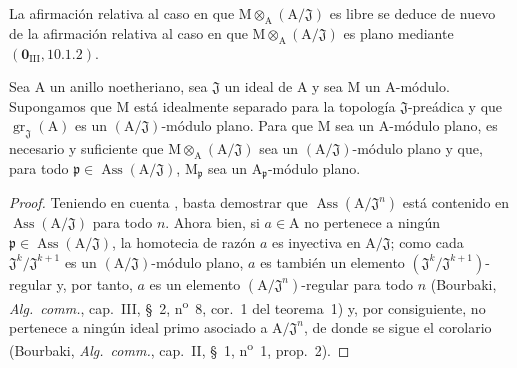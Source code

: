 La afirmación relativa al caso en que $\mathrm{M}\otimes_\mathrm{A}(\mathrm{A}/\mathfrak{J})$ es libre se deduce de nuevo de la afirmación relativa al caso en que $\mathrm{M}\otimes_\mathrm{A}(\mathrm{A}/\mathfrak{J})$ es plano mediante $(\mathbf{0}_{\mathrm{III}},10.1.2)$.

\begin{corollary}[11.4.10]
\label{IV.11.4.10}
Sea $\mathrm{A}$ un anillo noetheriano, sea $\mathfrak{J}$ un ideal de $\mathrm{A}$ y sea $\mathrm{M}$ un $\mathrm{A}$-módulo.
Supongamos que $\mathrm{M}$ está idealmente separado para la topología $\mathfrak{J}$-preádica y que $\operatorname{gr}_\mathfrak{J}(\mathrm{A})$ es un
$(\mathrm{A}/\mathfrak{J})$-módulo plano. Para que $\mathrm{M}$ sea un $\mathrm{A}$-módulo plano, es necesario y suficiente que $\mathrm{M}\otimes_\mathrm{A}(\mathrm{A}/\mathfrak{J})$ sea
un $(\mathrm{A}/\mathfrak{J})$-módulo plano y que, para todo $\mathfrak{p}\in\operatorname{Ass}(\mathrm{A}/\mathfrak{J})$, $\mathrm{M}_\mathfrak{p}$ sea un $\mathrm{A}_\mathfrak{p}$-módulo plano.
\end{corollary}

\begin{proof}
Teniendo en cuenta , basta demostrar que $\operatorname{Ass}(\mathrm{A}/\mathfrak{J}^n)$ está contenido en
$\operatorname{Ass}(\mathrm{A}/\mathfrak{J})$ para todo $n$. Ahora bien, si $a\in\mathrm{A}$ no pertenece a ningún $\mathfrak{p}\in\operatorname{Ass}(\mathrm{A}/\mathfrak{J})$, la homotecia
de razón $a$ es inyectiva en $\mathrm{A}/\mathfrak{J}$; como cada $\mathfrak{J}^k/\mathfrak{J}^{k+1}$ es un $(\mathrm{A}/\mathfrak{J})$-módulo
plano, $a$ es también un elemento $(\mathfrak{J}^k/\mathfrak{J}^{k+1})$-regular y, por tanto, $a$ es un elemento $(\mathrm{A}/\mathfrak{J}^n)$-regular para todo $n$
(Bourbaki, \emph{Alg.\ comm.}, cap.~III, \S~2, n\textsuperscript{o}~8, cor.~1 del teorema~1) y, por consiguiente, no pertenece
a ningún ideal primo asociado a $\mathrm{A}/\mathfrak{J}^n$, de donde se sigue el corolario (Bourbaki, \emph{Alg.\ comm.}, cap.~II,
\S~1, n\textsuperscript{o}~1, prop.~2).
\end{proof}

